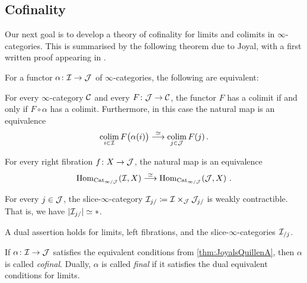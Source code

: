 \subsection{Cofinality}
Our next goal is to develop a theory of cofinality for limits and colimits in $\infty$-categories. This is summarised by the following theorem due to Joyal, with a first written proof appearing in \cite[Theorem~]{HTT}.
\begin{thm}\label{thm:JoyalsQuillenA}
	For a functor $\alpha\colon\mathcal{I}\rightarrow \mathcal{J}$ of $\infty$-categories, the following are equivalent:
	\begin{alphanumerate}
		\item For every $\infty$-category $\mathcal{C}$ and every $F\colon \mathcal{J}\rightarrow \mathcal{C}$, the functor $F$ has a colimit if and only if $F\circ \alpha$ has a colimit. Furthermore, in this case the natural map is an equivalence\label{enum:Cofinal}
		\begin{equation*}
			\colimit_{i\in\Ii}F\lef(\alpha(i)\righ)\overset{\simeq}{\longrightarrow}\colimit_{j\in\Jj}F(j)\,.
		\end{equation*}
		\item For every right fibration $f\colon X\rightarrow\mathcal{J}$, the natural map 
		is an equivalence\label{enum:RightAnodyne}
		\begin{equation*}
			\operatorname{Hom}_{\mathrm{Cat}_{\infty/\mathcal{J}}}\!\left(\mathcal{I},X\right)\overset{\simeq}{\longrightarrow} \operatorname{Hom}_{\mathrm{Cat}_{\infty/\mathcal{J}}}\!\left(\mathcal{J},X\right)\,.
		\end{equation*}
		\item For every $j\in\mathcal{J}$, the slice-$\infty$-category $\mathcal{I}_{j/}\coloneqq \mathcal{I}\times_{\mathcal{J}}\mathcal{J}_{j/}$ is weakly contractible. That is, we have $\mathopen|\mathcal{I}_{j/}\mathclose|\simeq *$.\label{enum:WeaklyContractible}
	\end{alphanumerate}
	A dual assertion holds for limits, left fibrations, and the slice-$\infty$-categories $\mathcal{I}_{/j}$.
\end{thm}
\begin{defi}
	If $\alpha\colon \mathcal{I}\rightarrow\mathcal{J}$ satisfies the equivalent conditions from \cref{thm:JoyalsQuillenA}, then $\alpha$ is called \emph{cofinal}. Dually, $\alpha$ is called \emph{final} if it satisfies the dual equivalent conditions for limits.
\end{defi}
